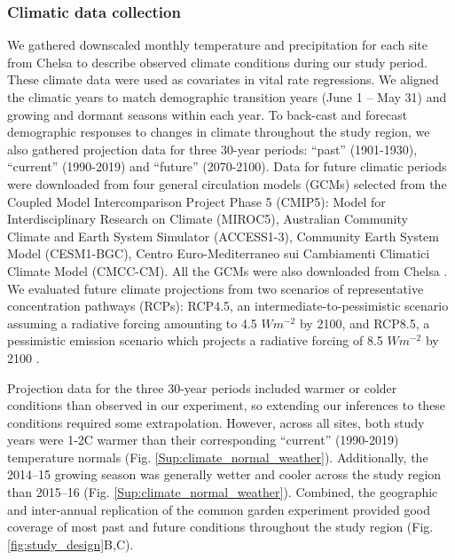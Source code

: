 \documentclass[12pt]{article}\usepackage[]{graphicx}\usepackage[dvipsnames]{xcolor}
\begin{document}
\subsubsection*{Climatic data collection}
We gathered downscaled monthly temperature and precipitation for each site from Chelsa \citep{karger2017climatologies} to describe observed climate conditions during our study period.
These climate data were used as covariates in vital rate regressions. 
We aligned the climatic years to match demographic transition years (June 1 -- May 31) and growing and dormant seasons within each year.
To back-cast and forecast demographic responses to changes in climate throughout the study region, we also gathered projection data for three 30-year periods: ``past'' (1901-1930), ``current'' (1990-2019) and ``future'' (2070-2100).
Data for future climatic periods were downloaded from four general circulation models (GCMs) selected from the Coupled Model Intercomparison Project Phase 5 (CMIP5): Model for Interdisciplinary Research on Climate (MIROC5), Australian Community Climate and Earth System Simulator (ACCESS1-3), Community Earth System Model (CESM1-BGC), Centro Euro-Mediterraneo sui Cambiamenti Climatici Climate Model (CMCC-CM).
All the GCMs were also downloaded from Chelsa \citep{sanderson2015representative}.
We evaluated future climate projections from two scenarios of representative concentration pathways (RCPs): RCP4.5, an intermediate-to-pessimistic scenario assuming a radiative forcing amounting to 4.5 $W m^{-2}$ by 2100, and RCP8.5, a pessimistic emission scenario which projects a radiative forcing of 8.5 $W m^{-2}$ by 2100 \citep{thomson2011rcp4, schwalm2020rcp8}. 

Projection data for the three 30-year periods included warmer or colder conditions than observed in our experiment, so extending our inferences to these conditions required some extrapolation. 
However, across all sites, both study years were 1-2\degree C warmer than their corresponding ``current'' (1990-2019) temperature normals (Fig. \ref{Sup:climate_normal_weather}). 
Additionally, the 2014--15 growing season was generally wetter and cooler across the study region than 2015--16 (Fig. \ref{Sup:climate_normal_weather}). 
Combined, the geographic and inter-annual replication of the common garden experiment provided good coverage of most past and future conditions throughout the study region (Fig. \ref{fig:study_design}B,C). 
\end{document}
